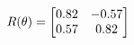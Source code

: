 \documentclass[preview]{standalone}
\begin{document}
\begin{align*}
\special{dvisvgm:raw <g id='unique000'>}R(\theta) = \begin{bmatrix}0.82 & -0.57\\0.57 & 0.82\end{bmatrix}\special{dvisvgm:raw </g>}
\end{align*}
\end{document}
